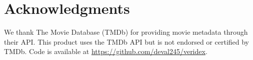 \documentclass[11pt]{article}
\begin{document}
\section*{Acknowledgments}

We thank The Movie Database (TMDb) for providing movie metadata through their API. This product uses the TMDb API but is not endorsed or certified by TMDb. Code is available at \url{https://github.com/deval245/veridex}.

\end{document}

